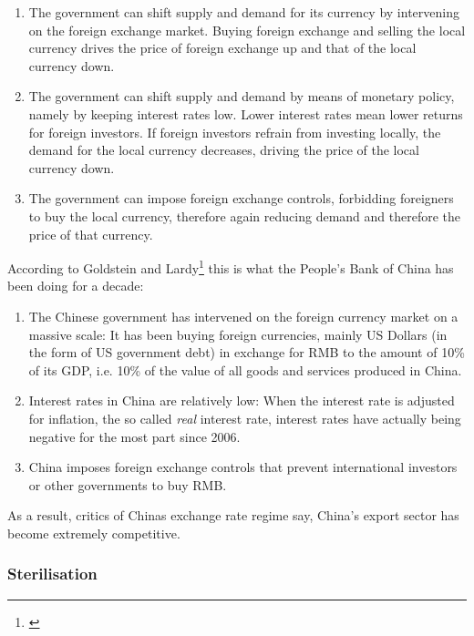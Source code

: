\documentclass[11pt]{article}
\begin{document}
\begin{enumerate}
\item{The government can shift supply and demand for its currency by intervening on the foreign exchange market. Buying foreign exchange and selling the local currency drives the price of foreign exchange up and that of the local currency down.}
\item{The government can shift supply and demand by means of monetary policy, namely by keeping interest rates low. Lower interest rates mean lower returns for foreign investors. If foreign investors refrain from investing locally, the demand for the local currency decreases, driving the price of the local currency down.}
\item{The government can impose foreign exchange controls, forbidding foreigners to buy the local currency, therefore again reducing demand and therefore the price of that currency.}
\end{enumerate}

According to Goldstein and Lardy\footnote{\cite[pp.  
40]{GoldsteinLardy2008}}  this is what the People's Bank of China has been doing for a decade:

\begin{enumerate}
\item{The Chinese government has intervened on the foreign currency 
		market on a massive scale: It has been buying foreign 
		currencies, mainly US Dollars (in the form of US government 
		debt) in exchange for RMB to the amount of 10\% of its GDP, i.e. 
		10\% of the value of all goods and services produced in China.} 
\item{Interest rates in China are relatively low: When the interest rate is adjusted for inflation, the so called \emph{real} interest rate, interest rates have actually being negative for the most part since 2006.} %
\item{China imposes foreign exchange controls that prevent international investors or other governments to buy RMB.}%
\end{enumerate}

As a result, critics of Chinas exchange rate regime say, China's export sector has become extremely competitive. 


\subsubsection{Sterilisation}
\end{document}
